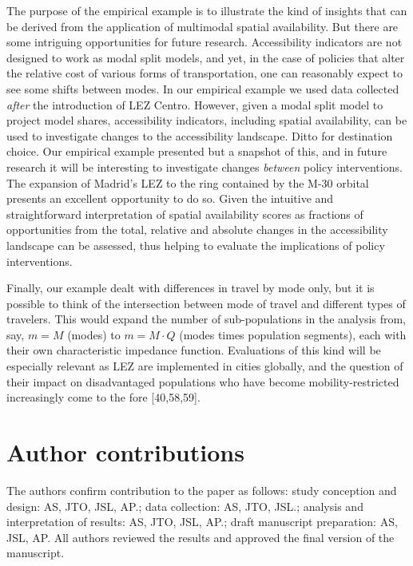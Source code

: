 \documentclass[10pt,letterpaper]{article}
\begin{document}
The purpose of the empirical example is to illustrate the kind of
insights that can be derived from the application of multimodal spatial
availability. But there are some intriguing opportunities for future
research. Accessibility indicators are not designed to work as modal
split models, and yet, in the case of policies that alter the relative
cost of various forms of transportation, one can reasonably expect to
see some shifts between modes. In our empirical example we used data
collected \emph{after} the introduction of LEZ Centro. However, given a
modal split model to project model shares, accessibility indicators,
including spatial availability, can be used to investigate changes to
the accessibility landscape. Ditto for destination choice. Our empirical
example presented but a snapshot of this, and in future research it will
be interesting to investigate changes \emph{between} policy
interventions. The expansion of Madrid's LEZ to the ring contained by
the M-30 orbital presents an excellent opportunity to do so. Given the
intuitive and straightforward interpretation of spatial availability
scores as fractions of opportunities from the total, relative and
absolute changes in the accessibility landscape can be assessed, thus
helping to evaluate the implications of policy interventions.

Finally, our example dealt with differences in travel by mode only, but
it is possible to think of the intersection between mode of travel and
different types of travelers. This would expand the number of
sub-populations in the analysis from, say, \(m=M\) (modes) to
\(m = M\cdot Q\) (modes times population segments), each with their own
characteristic impedance function. Evaluations of this kind will be
especially relevant as LEZ are implemented in cities globally, and the
question of their impact on disadvantaged populations who have become
mobility-restricted increasingly come to the fore {[}40,58,59{]}.

\hypertarget{author-contributions}{%
\section{Author contributions}\label{author-contributions}}

The authors confirm contribution to the paper as follows: study
conception and design: AS, JTO, JSL, AP.; data collection: AS, JTO,
JSL.; analysis and interpretation of results: AS, JTO, JSL, AP.; draft
manuscript preparation: AS, JSL, AP. All authors reviewed the results
and approved the final version of the manuscript.
\end{document}
